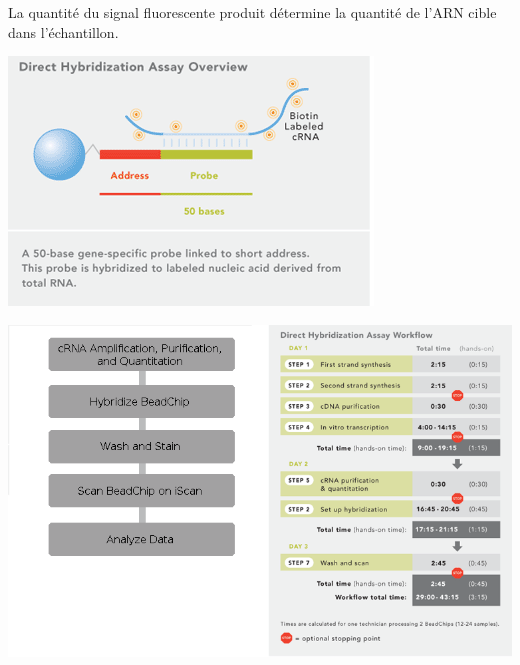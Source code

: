 \documentclass[a4paper,10pt]{article}
\begin{document}
La quantité du signal fluorescente produit détermine la quantité de l’ARN cible dans l’échantillon.
\begin{center}
 \includegraphics[scale=0.5]{./image/Direct_Hyb.png}
\end{center}
\begin{center}
 \includegraphics[scale=0.5]{./image/direct_hybridization_assay_workflow.png}
\end{center}
\end{document}

